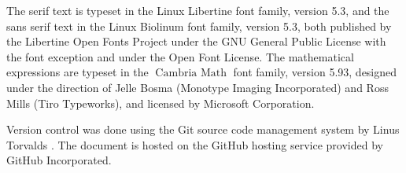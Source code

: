 \documentclass[10pt, a4paper, twoside]{lecturenotes}
\begin{document}
The serif text is typeset in the Linux Libertine font family, version 5.3, and the sans serif text in the \textsf{Linux Biolinum} font family, version 5.3, both published by the Libertine Open Fonts Project under the GNU
General Public License with the font exception and under the Open Font License. The mathematical expressions are typeset in the $\operatorname{Cambria~Math}$ font family, version 5.93, designed under the direction of Jelle Bosma (Monotype Imaging Incorporated) and Ross Mills (Tiro Typeworks), and licensed by Microsoft Corporation.

Version control was done using the Git source code management system by Linus Torvalds . The document is hosted on the GitHub hosting service provided by GitHub Incorporated.
\end{document}
